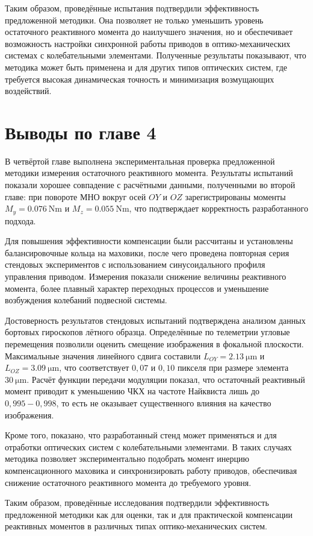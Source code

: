  Таким образом, проведённые испытания подтвердили эффективность предложенной методики. Она позволяет не только уменьшить уровень остаточного реактивного момента до наилучшего значения, но и обеспечивает возможность настройки синхронной работы приводов в оптико-механических системах с колебательными элементами. Полученные результаты показывают, что методика может быть применена и для других типов оптических систем, где требуется высокая динамическая точность и минимизация возмущающих воздействий.
 
 
 \section*{Выводы по главе 4}
 
В четвёртой главе выполнена экспериментальная проверка предложенной методики измерения остаточного реактивного момента. Результаты испытаний показали хорошее совпадение с расчётными данными, полученными во второй главе: при повороте МНО вокруг осей $OY$ и $OZ$ зарегистрированы моменты $M_y = \SI{0,076}{\newton\meter}$ и $M_z=\SI{0,055}{\newton\meter}$, что подтверждает корректность разработанного подхода.

Для повышения эффективности компенсации были рассчитаны и установлены балансировочные кольца на маховики, после чего проведена повторная серия стендовых экспериментов с использованием синусоидального профиля управления приводом. Измерения показали снижение величины реактивного момента, более плавный характер переходных процессов и уменьшение возбуждения колебаний подвесной системы. 

Достоверность результатов стендовых испытаний подтверждена анализом данных бортовых гироскопов лётного образца. Определённые по телеметрии угловые перемещения позволили оценить смещение изображения в фокальной плоскости. Максимальные значения линейного сдвига составили $L_{OY} = \SI{2,13}{\micro\meter}$ и $L_{OZ} = \SI{3,09}{\micro\meter}$, что соответствует $0,07$ и $0,10$ пикселя при размере элемента $\SI{30}{\micro\meter}$.
Расчёт функции передачи модуляции показал, что остаточный реактивный момент приводит к уменьшению 
ЧКХ на частоте Найквиста лишь до $0,995-0,998$, то есть не оказывает существенного влияния на качество изображения.
 
Кроме того, показано, что разработанный стенд может применяться и для отработки оптических систем с колебательными элементами. В таких случаях методика позволяет экспериментально подобрать момент инерцию компенсационного маховика и синхронизировать работу приводов, обеспечивая снижение остаточного реактивного момента до требуемого уровня.

Таким образом, проведённые исследования подтвердили эффективность предложенной методики как для оценки, так и для практической компенсации реактивных моментов в различных типах оптико-механических систем.
 
 
\FloatBarrier




